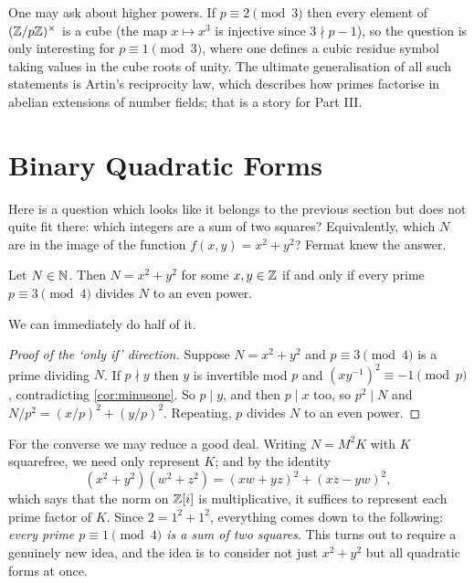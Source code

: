 \documentclass[a4paper]{scrartcl}
\begin{document}
\begin{remark}
	One may ask about higher powers. If $p \equiv 2 \pmod 3$ then every element of $(\mathbb{Z}/p\mathbb{Z})^\times$ is a cube (the map $x \mapsto x^3$ is injective since $3 \nmid p-1$), so the question is only interesting for $p \equiv 1 \pmod 3$, where one defines a cubic residue symbol taking values in the cube roots of unity. The ultimate generalisation of all such statements is Artin's reciprocity law, which describes how primes factorise in abelian extensions of number fields; that is a story for Part III.
\end{remark}

\section{Binary Quadratic Forms}

Here is a question which looks like it belongs to the previous section but does not quite fit there: which integers are a sum of two squares? Equivalently, which $N$ are in the image of the function $f(x,y) = x^2 + y^2$? Fermat knew the answer.

\begin{theorem}\label{thm:twosquares}
	Let $N \in \mathbb{N}$. Then $N = x^2 + y^2$ for some $x, y \in \mathbb{Z}$ if and only if every prime $p \equiv 3 \pmod 4$ divides $N$ to an even power.
\end{theorem}

We can immediately do half of it.

\begin{proof}[Proof of the `only if' direction]
	Suppose $N = x^2 + y^2$ and $p \equiv 3 \pmod 4$ is a prime dividing $N$. If $p \nmid y$ then $y$ is invertible mod $p$ and $(xy^{-1})^2 \equiv -1 \pmod p$, contradicting \autoref{cor:minusone}. So $p \mid y$, and then $p \mid x$ too, so $p^2 \mid N$ and $N/p^2 = (x/p)^2 + (y/p)^2$. Repeating, $p$ divides $N$ to an even power.
\end{proof}

For the converse we may reduce a good deal. Writing $N = M^2 K$ with $K$ squarefree, we need only represent $K$; and by the identity
$$
(x^2 + y^2)(w^2 + z^2) = (xw + yz)^2 + (xz - yw)^2,
$$
which says that the norm on $\mathbb{Z}[i]$ is multiplicative, it suffices to represent each prime factor of $K$. Since $2 = 1^2 + 1^2$, everything comes down to the following: \emph{every prime $p \equiv 1 \pmod 4$ is a sum of two squares}. This turns out to require a genuinely new idea, and the idea is to consider not just $x^2 + y^2$ but all quadratic forms at once.
\end{document}
